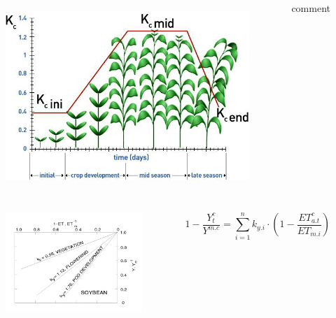   \begin{frame}{\ba}{\baa}
    \begin{columns}
      \centering
        \begin{figure}
         \includegraphics[width=\textwidth]{Figures/Crop-coefficients-Kc-and-growing-period-of-tomato-source-Allen-et-al-1998.png}
         \label{fig:y equals x}
        \end{figure}
        comment
    \end{columns}
\end{frame}

\begin{frame}{\ba}{\baa}
  \begin{columns}
  \begin{figure}
    \centering
    \includegraphics[width=\textwidth]{Figures/Y3655E01.jpeg}
  \end{figure}
  \begin{equation}
    1-\frac{Y_t^c}{Y^{m.c}}=\sum_{i=1}^{n} k_{y.i} \cdot(1-\frac{ET_{a.t}^c}{ET_{m.i}}) 
  \end{equation}
\end{columns} 
\end{frame}

